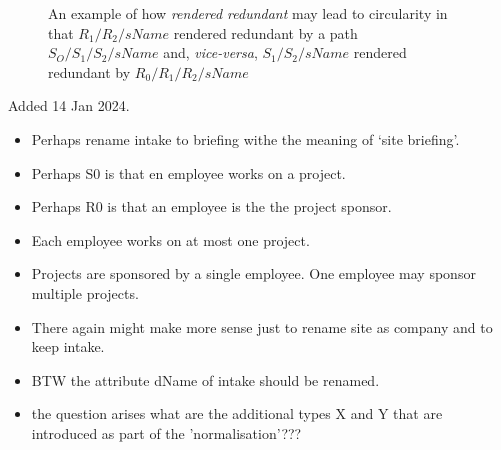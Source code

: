 \begin{figure} [h]
\begin{center}
\end{center}
\caption{An example  of how \textit{rendered redundant} may lead to circularity in that
$R_1/R_2/sName$  rendered redundant by a path $S_O/S_1/S_2/sName$  and, \textit{vice-versa}, 
$S_1/S_2/sName$ rendered redundant by $R_0/R_1/R_2/sName$}
\label{employeeintake}
\end{figure}

\begin{newtt}
Added 14 Jan 2024. 
\begin{itemize}
	\item Perhaps rename intake to briefing withe the meaning of `site briefing'.
	\item Perhaps S0 is that en employee works on a project.
	\item Perhaps R0 is that an employee is the the project sponsor. 
	\item Each employee works on at most one project.
	\item Projects are sponsored by a single employee. One employee may sponsor multiple projects.  
	\item There again might make more sense just to rename site as company and to keep intake.
	\item BTW the attribute dName of intake should be renamed.
	\item the question arises what are the additional types X and Y that are introduced as part of the 'normalisation'???
\end{itemize}
\end{newtt}